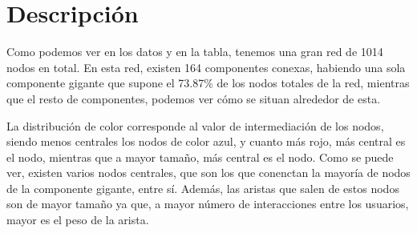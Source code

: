 \documentclass[paper=a4, fontsize=11pt]{article} %
\numberwithin{equation}{section} %
\numberwithin{figure}{section} %
\numberwithin{table}{section} %
\begin{document}
\section{Descripción}

Como podemos ver en los datos y en la tabla, tenemos una gran red de 1014 nodos en total. En esta red, existen 164 componentes conexas, habiendo una sola componente gigante que supone el 73.87\% de los nodos totales de la red, mientras que el resto de componentes, podemos ver cómo se situan alrededor de esta. 

La distribución de color corresponde al valor de intermediación de los nodos, siendo menos centrales los nodos de color azul, y cuanto más rojo, más central es el nodo, mientras que a mayor tamaño, más central es el nodo. Como se puede ver, existen varios nodos centrales, que son los que conenctan la mayoría de nodos de la componente gigante, entre sí. Además, las aristas que salen de estos nodos son de mayor tamaño ya que, a mayor número de interacciones entre los usuarios, mayor es el peso de la arista. 
\end{document}
